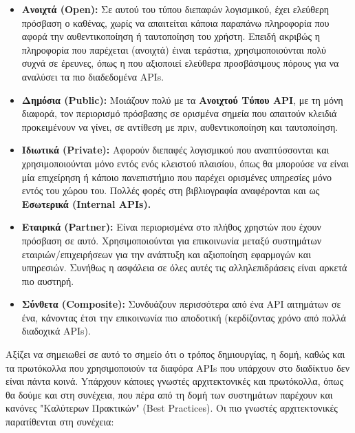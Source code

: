\begin{itemize}
	\item \textbf{Ανοιχτά (Open):} Σε αυτού του τύπου διεπαφών λογισμικού, έχει ελεύθερη πρόσβαση ο καθένας,
		χωρίς να απαιτείται κάποια παραπάνω πληροφορία που αφορά την αυθεντικοποίηση ή ταυτοποίηση του χρήστη.
		Επειδή ακριβώς η πληροφορία που παρέχεται (ανοιχτά) έιναι τεράστια, χρησιμοποιούνται πολύ
		συχνά σε έρευνες, όπως η \cite{open_restful_api_analysis} που αξιοποιεί ελεύθερα προσβάσιμους
		πόρους για να αναλύσει τα πιο διαδεδομένα APIs. 
	\item \textbf{Δημόσια (Public):} Μοιάζουν πολύ με τα \textbf{Ανοιχτού Τύπου API}, με τη μόνη διαφορά, τον περιορισμό
		πρόσβασης σε ορισμένα σημεία που απαιτούν κλειδιά προκειμένουν να γίνει, σε αντίθεση με πριν, αυθεντικοποίηση και ταυτοποίηση. 
	\item \textbf{Ιδιωτικά (Private):} Αφορούν διεπαφές λογισμικού που αναπτύσσονται και χρησιμοποιούνται μόνο εντός ενός κλειστού
		πλαισίου, όπως θα μπορούσε να είναι μία επιχείρηση ή κάποιο πανεπιστήμιο που παρέχει ορισμένες υπηρεσίες μόνο εντός του χώρου του.
		Πολλές φορές στη βιβλιογραφία αναφέρονται και ως \textbf{Εσωτερικά (Internal APIs).}
	\item \textbf{Εταιρικά (Partner):} Είναι περιορισμένα στο πλήθος χρηστών που έχουν πρόσβαση σε αυτό. Χρησιμοποιούνται
		για επικοινωνία μεταξύ συστημάτων εταιριών/επιχειρήσεων για την ανάπτυξη και αξιοποίηση εφαρμογών και υπηρεσιών.
		Συνήθως η ασφάλεια σε όλες αυτές τις αλληλεπιδράσεις είναι αρκετά πιο αυστηρή.
	\item \textbf{Σύνθετα (Composite):} Συνδυάζουν περισσότερα από ένα API αιτημάτων σε ένα, κάνοντας έτσι 
		την επικοινωνία πιο αποδοτική (κερδίζοντας χρόνο από πολλά διαδοχικά APIs).
\end{itemize}

Αξίζει να σημειωθεί σε αυτό το σημείο ότι ο τρόπος δημιουργίας, η δομή, καθώς και τα πρωτόκολλα που χρησιμοποιούν τα διαφόρα APIs που υπάρχουν στο διαδίκτυο
δεν είναι πάντα κοινά. Yπάρχουν κάποιες γνωστές αρχιτεκτονικές και πρωτόκολλα, όπως θα δούμε και στη συνέχεια, που πέρα από τη δομή
των συστημάτων παρέχουν και κανόνες "Καλύτερων Πρακτικών" (Best Practices). Οι πιο γνωστές αρχιτεκτονικές
παρατίθενται στη συνέχεια:

